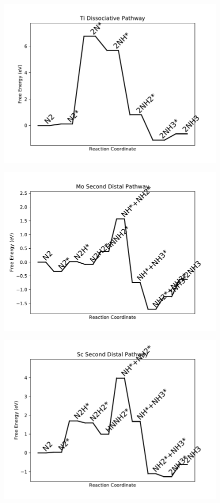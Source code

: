 \begin{figure}
\includegraphics[width=0.8\linewidth]{data/plots/Ti_dissociative.pdf}
\label{fig:Ti_dissociative}
\end{figure}

\begin{figure}
\includegraphics[width=0.8\linewidth]{data/plots/Mo_distal_2.pdf}
\label{fig:Mo_distal_2}
\end{figure}

\begin{figure}
\includegraphics[width=0.8\linewidth]{data/plots/Sc_distal_2.pdf}
\label{fig:Sc_distal_2}
\end{figure}

